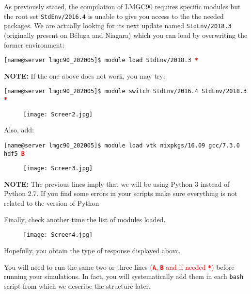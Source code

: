 \documentclass[12pt]{article}
\newcommand*\ruleline[1]{\par\noindent\raisebox{.8ex}{\makebox[\linewidth]{\hrulefill\hspace{1ex}\raisebox{-.8ex}{#1}\hspace{1ex}\hrulefill}}}
\begin{document}
\begin{mdframed}
\vspace{0.5cm}
\ruleline{If you are using \textbf{Cedar} or \textbf{Graham}}

As previously stated, the compilation of LMGC90 requires specific modules but the root set \texttt{StdEnv/2016.4} is unable to give you access to the the needed packages. We are actually looking for its next update named \texttt{StdEnv/2018.3} (originally present on Béluga and Niagara) which you can load by overwriting the former environment:
\begin{tcolorbox}
\texttt{[name@server lmgc90\_202005]\$ module load StdEnv/2018.3 \textcolor{red}{\textbf{*}}} 
\end{tcolorbox}

\textbf{NOTE:} If the one above does not work, you may try:
\begin{tcolorbox}
\texttt{[name@server lmgc90\_202005]\$ module switch StdEnv/2016.4 StdEnv/2018.3 \textcolor{red}{\textbf{*}}} 
\end{tcolorbox}
\begin{figure}[H]
  \centering
  \texttt{[image: Screen2.jpg]}
\end{figure}
\break

\end{mdframed}
\vspace{0.5cm}

Also, add:
\begin{tcolorbox}
\texttt{[name@server lmgc90\_202005]\$ module load vtk nixpkgs/16.09 gcc/7.3.0 hdf5 \textcolor{red}{\textbf{B}}} 
\end{tcolorbox}
\begin{figure}[H]
  \centering
  \texttt{[image: Screen3.jpg]}
\end{figure}
\vspace{-0.2cm}
\textbf{NOTE:} The previous lines imply that we will be using Python 3 instead of Python 2.7. If you find some errors in your scripts make sure everything is not related to the version of Python

Finally, check another time the list of modules loaded.
\begin{figure}[H]
  \centering
  \texttt{[image: Screen4.jpg]}
\end{figure}

Hopefully, you obtain the type of response displayed abovc.

You will need to run the same two or three lines \textcolor{red}{(\texttt{\textbf{A}}, \texttt{\textbf{B}} and if needed \texttt{\textbf{*}})} before running your simulations. In fact, you will systematically add them in each \texttt{bash} script from which we describe the structure later.
\end{document}
